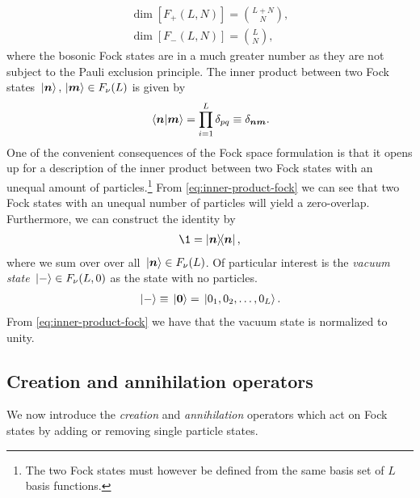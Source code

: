             \begin{gather}
                \dim[F_{+}(L, N)] = \binom{L + N}{N},
                \\
                \dim[F_{-}(L, N)] = \binom{L}{N},
            \end{gather}
            where the bosonic Fock states are in a much greater number as they
            are not subject to the Pauli exclusion principle.
            The inner product between two Fock states $\ket*{\boldsymbol{n}},
            \ket*{\boldsymbol{m}} \in F_{\nu}(L)$ is given by
            \begin{align}
                \braket*{\boldsymbol{n}}{\boldsymbol{m}} = \prod_{i = 1}^{L} \delta_{pq}
                \equiv \delta_{\boldsymbol{n}\boldsymbol{m}}.
                \label{eq:inner-product-fock}
            \end{align}
            One of the convenient consequences of the Fock space formulation is
            that it opens up for a description of the inner product between two
            Fock states with an unequal amount of particles.\footnote{%
                The two Fock states must however be defined from the same basis
                set of $L$ basis functions.
            }
            From \autoref{eq:inner-product-fock} we can see that two Fock states
            with an unequal number of particles will yield a zero-overlap.
            Furthermore, we can construct the identity by
            \begin{align}
                \1 = \dyad{\vfg{n}}{\vfg{n}},
                \label{eq:fock-identity}
            \end{align}
            where we sum over over all $\ket*{\boldsymbol{n}} \in F_{\nu}(L)$.
            Of particular interest is the \emph{vacuum state} $\ket*{-} \in
            F_{\nu}(L, 0)$ as the state with no particles.
            \begin{align}
                \ket*{-} \equiv \ket*{\boldsymbol{0}}
                = \ket*{0_1, 0_2, \dots, 0_L}.
            \end{align}
            From \autoref{eq:inner-product-fock} we have that the vacuum state
            is normalized to unity.

        \subsection{Creation and annihilation operators}
            We now introduce the \emph{creation} and \emph{annihilation}
            operators which act on Fock states by adding or removing single
            particle states.

